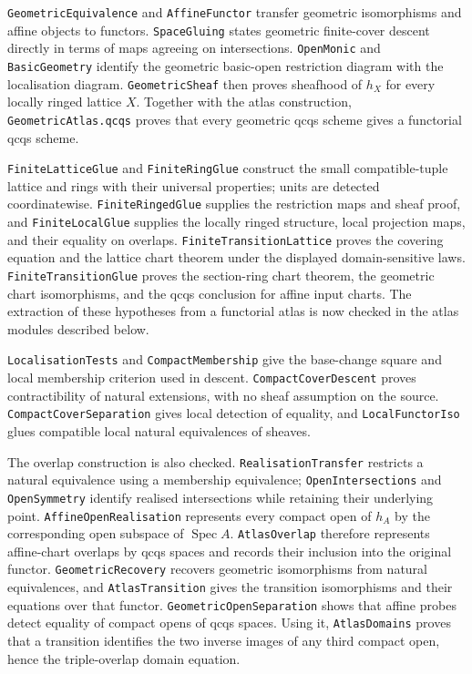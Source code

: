 \documentclass[11pt]{amsart}
\theoremstyle{definition}\newtheorem{definition}[theorem]{Definition}
\theoremstyle{remark}\newtheorem{remark}[theorem]{Remark}
\newcommand{\Spec}{\operatorname{Spec}}
\begin{document}
\texttt{GeometricEquivalence} and \texttt{AffineFunctor} transfer
geometric isomorphisms and affine objects to functors.
\texttt{SpaceGluing} states geometric finite-cover descent directly in
terms of maps agreeing on intersections. \texttt{OpenMonic} and
\texttt{BasicGeometry} identify the geometric basic-open restriction
diagram with the localisation diagram. \texttt{GeometricSheaf} then
proves sheafhood of $h_X$ for every locally ringed lattice $X$.
Together with the atlas construction, \texttt{GeometricAtlas.qcqs}
proves that every geometric qcqs scheme gives a functorial qcqs scheme.

\texttt{FiniteLatticeGlue} and \texttt{FiniteRingGlue} construct the
small compatible-tuple lattice and rings with their universal
properties; units are detected coordinatewise.
\texttt{FiniteRingedGlue} supplies the restriction maps and sheaf proof,
and \texttt{FiniteLocalGlue} supplies the locally ringed structure,
local projection maps, and their equality on overlaps.
\texttt{FiniteTransitionLattice} proves the covering equation and the
lattice chart theorem under the displayed domain-sensitive laws.
\texttt{FiniteTransitionGlue} proves the section-ring chart theorem,
the geometric chart isomorphisms, and the qcqs conclusion for affine
input charts. The extraction of these hypotheses from a functorial atlas
is now checked in the atlas modules described below.

\texttt{LocalisationTests} and \texttt{CompactMembership} give the
base-change square and local membership criterion used in descent.
\texttt{CompactCoverDescent} proves contractibility of natural extensions,
with no sheaf assumption on the source. \texttt{CompactCoverSeparation}
gives local detection of equality, and \texttt{LocalFunctorIso} glues
compatible local natural equivalences of sheaves.

The overlap construction is also checked. \texttt{RealisationTransfer}
restricts a natural equivalence using a membership equivalence;
\texttt{OpenIntersections} and \texttt{OpenSymmetry} identify realised
intersections while retaining their underlying point.
\texttt{AffineOpenRealisation} represents every compact open of $h_A$
by the corresponding open subspace of $\Spec A$.
\texttt{AtlasOverlap} therefore represents affine-chart overlaps by
qcqs spaces and records their inclusion into the original functor.
\texttt{GeometricRecovery} recovers geometric isomorphisms from natural
equivalences, and \texttt{AtlasTransition} gives the transition
isomorphisms and their equations over that functor.
\texttt{GeometricOpenSeparation} shows that affine probes detect
equality of compact opens of qcqs spaces. Using it,
\texttt{AtlasDomains} proves that a transition identifies the two
inverse images of any third compact open, hence the triple-overlap
domain equation.
\end{document}
